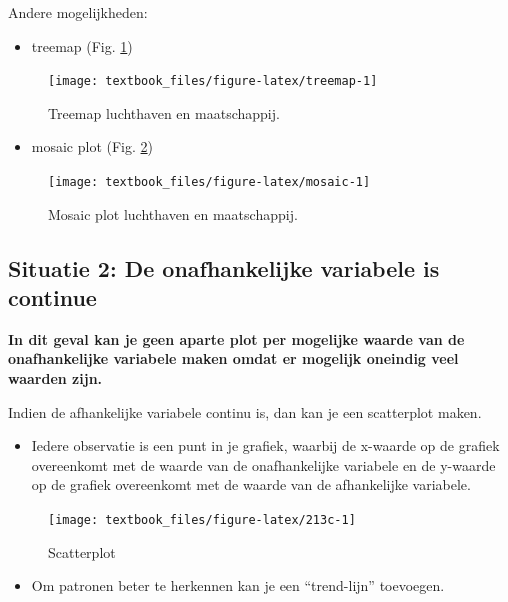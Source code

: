 \documentclass[]{tufte-book}
\providecommand{\tightlist}{%
  \setlength{\itemsep}{0pt}\setlength{\parskip}{0pt}}
\begin{document}
Andere mogelijkheden:

\begin{itemize}
\tightlist
\item
  treemap (Fig. \ref{fig:treemap})
\end{itemize}

\begin{figure}
\texttt{[image: textbook\_files/figure-latex/treemap-1]} \caption[Treemap luchthaven en maatschappij]{Treemap luchthaven en maatschappij.}\label{fig:treemap}
\end{figure}

\begin{itemize}
\tightlist
\item
  mosaic plot (Fig. \ref{fig:mosaic})
\end{itemize}

\begin{figure}
\texttt{[image: textbook\_files/figure-latex/mosaic-1]} \caption[Mosaic plot luchthaven en maatschappij]{Mosaic plot luchthaven en maatschappij.}\label{fig:mosaic}
\end{figure}

\hypertarget{situatie-2-de-onafhankelijke-variabele-is-continue}{%
\subsection{Situatie 2: De onafhankelijke variabele is continue}\label{situatie-2-de-onafhankelijke-variabele-is-continue}}

\textbf{In dit geval kan je geen aparte plot per mogelijke waarde van de onafhankelijke variabele maken omdat er mogelijk oneindig veel waarden zijn.}

Indien de afhankelijke variabele continu is, dan kan je een scatterplot maken.

\begin{itemize}
\tightlist
\item
  Iedere observatie is een punt in je grafiek, waarbij de x-waarde op de grafiek overeenkomt met de waarde van de onafhankelijke variabele en de y-waarde op de grafiek overeenkomt met de waarde van de afhankelijke variabele.
\end{itemize}

\begin{figure}
\texttt{[image: textbook\_files/figure-latex/213c-1]} \caption[Scatterplot]{Scatterplot}\label{fig:213c}
\end{figure}

\begin{itemize}
\tightlist
\item
  Om patronen beter te herkennen kan je een ``trend-lijn'' toevoegen.
\end{itemize}
\end{document}
